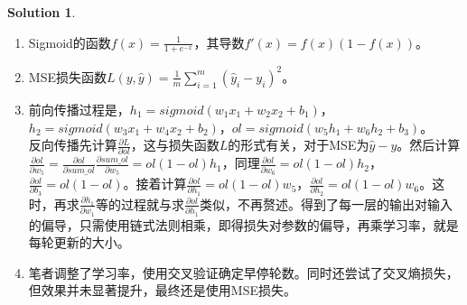 \documentclass[a4paper,UTF8]{article}
\theoremstyle{definition}
\newtheorem*{solution}{Solution}
\begin{document}
\begin{solution}
	~\\
	\begin{enumerate}[(1)]
		\item 
		Sigmoid的函数$f(x)=\frac{1}{1+e^{-x}}$，其导数$f'(x)=f(x)(1-f(x))$。
		\item 
		MSE损失函数$L(y,\hat{y})=\frac{1}{m}\sum_{i=1}^{m}(\hat{y}_i-y_i)^2$。
		\item 
		前向传播过程是，$h_1=sigmoid(w_1x_1+w_2x_2+b_1)$，$h_2=sigmoid(w_3x_1+w_4x_2+b_2)$，$ol=sigmoid(w_5h_1+w_6h_2+b_3)$。\\
		反向传播先计算$\frac{\partial L}{\partial ol}$，这与损失函数$L$的形式有关，对于MSE为$\hat{y}-y$。然后计算$\frac{\partial ol}{\partial w_5}=\frac{\partial ol}{\partial sum\_ol}\frac{\partial sum\_ol}{\partial w_5}=ol(1-ol)h_1$，同理$\frac{\partial ol}{\partial w_6}=ol(1-ol)h_2$，$\frac{\partial ol}{\partial b_3}=ol(1-ol)$。接着计算$\frac{\partial ol}{\partial h_1}=ol(1-ol)w_5$，$\frac{\partial ol}{\partial h_2}=ol(1-ol)w_6$。这时，再求$\frac{\partial h_1}{\partial w_1}$等的过程就与求$\frac{\partial ol}{\partial h_1}$类似，不再赘述。得到了每一层的输出对输入的偏导，只需使用链式法则相乘，即得损失对参数的偏导，再乘学习率，就是每轮更新的大小。
		\item 
		笔者调整了学习率，使用交叉验证确定早停轮数。同时还尝试了交叉熵损失，但效果并未显著提升，最终还是使用MSE损失。
	\end{enumerate}
\end{solution}
\end{document}

